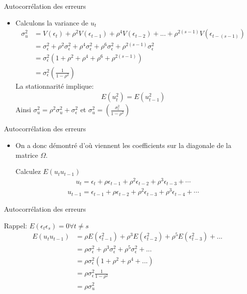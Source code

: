 \documentclass{beamer}
\begin{document}
\begin{frame}{Autocorrélation des erreurs}
\begin{itemize}
\item Calculons la variance de $u_t$
\begin{align*}
\sigma_u^2 & =V(\epsilon_t)+\rho^2V(\epsilon_{t-1})+\rho^4V(\epsilon_{t-2})+...+\rho^{2(s-1)}V(\epsilon_{t-(s-1)}) \\ & = \sigma_{\epsilon}^2+\rho^2\sigma_{\epsilon}^2+\rho^4\sigma_{\epsilon}^2+\rho^6\sigma_{\epsilon}^2+\rho^{2(s-1)}\sigma_{\epsilon}^2 \\ & = \sigma_{\epsilon}^2(1+\rho^2+\rho^4+\rho^6+\rho^{2(s-1)}) \\ & = \sigma_{\epsilon}^2 \left( \frac{1}{1-\rho^2} \right)
\end{align*}
La stationnarité implique:
\begin{align*}
E(u_{t}^2)=E(u_{t-1}^2)
\end{align*}
Ainsi $\sigma_{u}^2=\rho^2 \sigma_{u}^2+\sigma_{\epsilon}^2$ et $\sigma_{u}^2=\left(\frac{\sigma_{\epsilon}^2}{1-\rho^2} \right)$
\end{itemize}
\end{frame}

\begin{frame}{Autocorrélation des erreurs}
\begin{itemize}
\item On a donc démontré d’où viennent les coefficients sur la diagonale de la matrice $\Omega$.
\begin{block}{Calculez $E(u_tu_{t-1})$}
\begin{align*}
u_t = \epsilon_t +\rho \epsilon_{t-1}+\rho^{2}\epsilon_{t-2}+\rho^{3} \epsilon_{t-3}+\cdots
\end{align*}
\begin{align*}
u_{t-1} = \epsilon_{t-1} +\rho \epsilon_{t-2}+\rho^{2}\epsilon_{t-3}+\rho^{3} \epsilon_{t-4}+\cdots
\end{align*}
\end{block}
\end{itemize}
\end{frame}

\begin{frame}{Autocorrélation des erreurs}
\begin{block}{Rappel: $E(\epsilon_t \epsilon_s)=0 \forall t \neq s$}
\begin{align*}
E(u_t u_{t-1}) & = \rho E(\epsilon_{t-1}^2)+\rho^3 E(\epsilon_{t-2}^2)+\rho^5E(\epsilon_{t-3}^2)+...\\ & = \rho\sigma_{\epsilon}^2+\rho^3 \sigma_{\epsilon}^2+\rho^5 \sigma_{\epsilon}^2+... \\ & = \rho \sigma_{\epsilon}^2(1+\rho^2+\rho^4+...) \\ & = \rho \sigma_{\epsilon}^2 \frac{1}{1-\rho^2} \\ & = \rho \sigma_u^2
\end{align*}
\end{block}

\end{frame}
\end{document}
